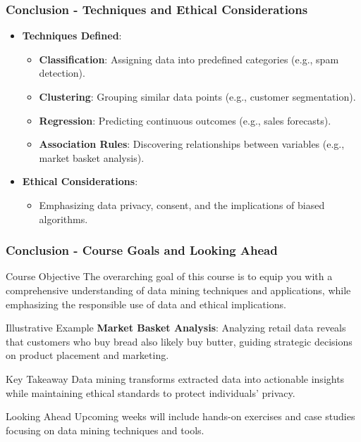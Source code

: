 \documentclass[aspectratio=169]{beamer}
\begin{document}
\begin{frame}[fragile]
  \frametitle{Conclusion - Techniques and Ethical Considerations}
  \begin{itemize}
    \item \textbf{Techniques Defined}:
      \begin{itemize}
        \item \textbf{Classification}: Assigning data into predefined categories (e.g., spam detection).
        \item \textbf{Clustering}: Grouping similar data points (e.g., customer segmentation).
        \item \textbf{Regression}: Predicting continuous outcomes (e.g., sales forecasts).
        \item \textbf{Association Rules}: Discovering relationships between variables (e.g., market basket analysis).
      \end{itemize}

    \item \textbf{Ethical Considerations}:
      \begin{itemize}
        \item Emphasizing data privacy, consent, and the implications of biased algorithms.
      \end{itemize}
  \end{itemize}
\end{frame}

\begin{frame}[fragile]
  \frametitle{Conclusion - Course Goals and Looking Ahead}
  \begin{block}{Course Objective}
    The overarching goal of this course is to equip you with a comprehensive understanding of data mining techniques and applications, while emphasizing the responsible use of data and ethical implications.
  \end{block}

  \begin{block}{Illustrative Example}
    \textbf{Market Basket Analysis}: 
    Analyzing retail data reveals that customers who buy bread also likely buy butter, guiding strategic decisions on product placement and marketing.
  \end{block}

  \begin{block}{Key Takeaway}
    Data mining transforms extracted data into actionable insights while maintaining ethical standards to protect individuals' privacy.
  \end{block}

  \begin{block}{Looking Ahead}
    Upcoming weeks will include hands-on exercises and case studies focusing on data mining techniques and tools.
  \end{block}
\end{frame}
\end{document}
